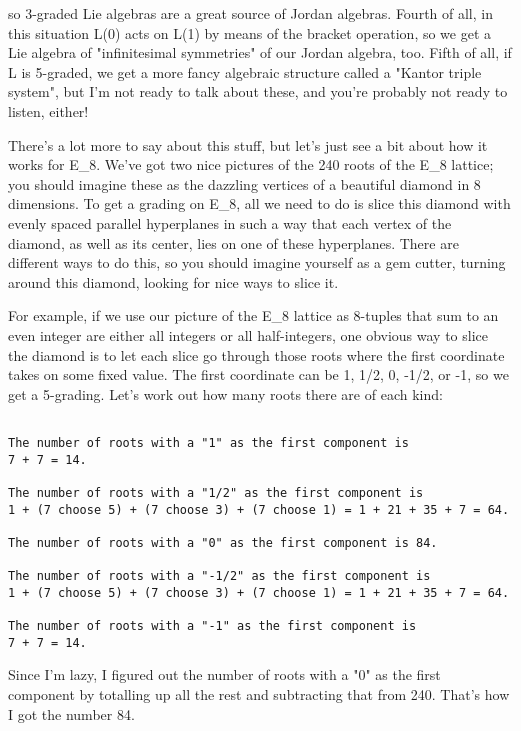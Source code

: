 so 3-graded Lie algebras are a great source of Jordan algebras.  Fourth
of all, in this situation L(0) acts on L(1) by means of the bracket
operation, so we get a Lie algebra of "infinitesimal
symmetries" of our Jordan algebra, too.  Fifth of all, if L is
5-graded, we get a more fancy algebraic structure called a "Kantor
triple system", but I'm not ready to talk about these, and you're
probably not ready to listen, either!

There's a lot more to say about this stuff, but let's just see a bit
about how it works for E_{8}.  We've got two nice pictures of the 240 roots
of the E_{8} lattice; you should imagine these as the dazzling vertices of
a beautiful diamond in 8 dimensions.  To get a grading on E_{8}, all we
need to do is slice this diamond with evenly spaced parallel hyperplanes
in such a way that each vertex of the diamond, as well as its center,
lies on one of these hyperplanes.  There are different ways to do this,
so you should imagine yourself as a gem cutter, turning around this
diamond, looking for nice ways to slice it.

For example, if we use our picture of the E_{8} lattice as 8-tuples that
sum to an even integer are either all integers or all half-integers, one
obvious way to slice the diamond is to let each slice go through those
roots where the first coordinate takes on some fixed value.  The first
coordinate can be 1, 1/2, 0, -1/2, or -1, so we get a 5-grading.  Let's
work out how many roots there are of each kind:


\begin{verbatim}

The number of roots with a "1" as the first component is
7 + 7 = 14.

The number of roots with a "1/2" as the first component is
1 + (7 choose 5) + (7 choose 3) + (7 choose 1) = 1 + 21 + 35 + 7 = 64.

The number of roots with a "0" as the first component is 84.

The number of roots with a "-1/2" as the first component is
1 + (7 choose 5) + (7 choose 3) + (7 choose 1) = 1 + 21 + 35 + 7 = 64.

The number of roots with a "-1" as the first component is
7 + 7 = 14.
\end{verbatim}
    
Since I'm lazy, I figured out the number of roots with a "0" 
as the first component by totalling up all the rest and subtracting
that from 240.  That's how I got the number 84.


